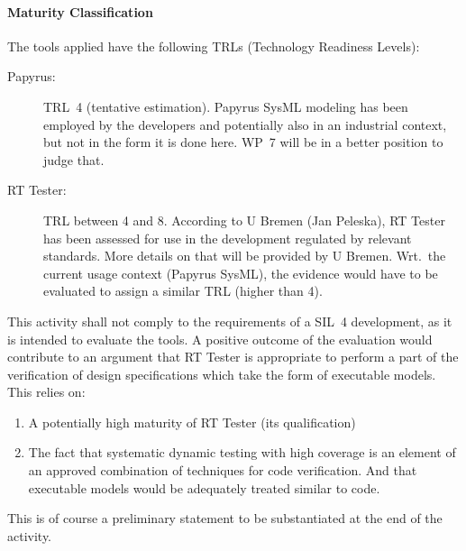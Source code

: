 \paragraph{Maturity Classification}

The tools applied have the following TRLs (Technology Readiness
Levels):
\begin{description}
\item[Papyrus:] TRL~4 (tentative estimation). Papyrus SysML modeling
  has been employed by the developers and potentially also in an
  industrial context, but not in the form it is done here. WP~7 will
  be in a better position to judge that.
\item[RT Tester:] TRL between 4 and 8. According to U Bremen (Jan
  Peleska), RT Tester has been assessed for use in the development
  regulated by relevant standards. More details on that will be
  provided by U Bremen. Wrt.\ the current usage context (Papyrus
  SysML), the evidence would have to be evaluated to assign a similar
  TRL (higher than 4).
\end{description}


This activity shall not comply to the requirements of a SIL~4
development, as it is intended to evaluate the tools. A positive
outcome of the evaluation would contribute to an argument that RT
Tester is appropriate to perform a part of the verification of design
specifications which take the form of executable models. This relies on:
\begin{enumerate}
\item A potentially high maturity of RT Tester (its
qualification)
\item The fact that systematic dynamic testing with high
coverage is an element of an approved combination of techniques for
code verification. And that executable models would be adequately
treated similar to code.
\end{enumerate}
This is of course a preliminary statement to be substantiated at the
end of the activity.  


%